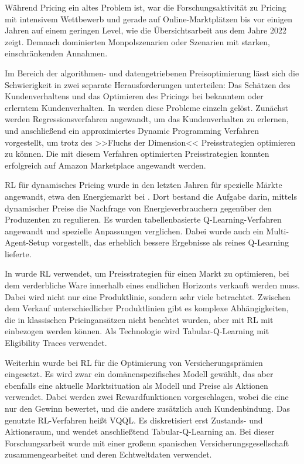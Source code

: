 Während Pricing ein altes Problem ist, war die Forschungsaktivität zu Pricing mit intensivem Wettbewerb und gerade auf Online-Marktplätzen bis vor einigen Jahren auf einem geringen Level, wie die Übersichtsarbeit \cite{Gerpott2022} aus dem Jahre 2022 zeigt.
Demnach dominierten Monpolszenarien oder Szenarien mit starken, einschränkenden Annahmen.

Im Bereich der algorithmen- und datengetriebenen Preisoptimierung lässt sich die Schwierigkeit in zwei separate Herausforderungen unterteilen: Das Schätzen des Kundenverhaltens und das Optimieren des Pricings bei bekanntem oder erlerntem Kundenverhalten.
In \cite{10.1145/3219819.3219833} werden diese Probleme einzeln gelöst.
Zunächst werden Regressionsverfahren angewandt, um das Kundenverhalten zu erlernen, und anschließend ein approximiertes Dynamic Programming Verfahren vorgestellt, um trotz des >>Fluchs der Dimension<< Preisstrategien optimieren zu können.
Die mit diesem Verfahren optimierten Preisstrategien konnten erfolgreich auf Amazon Marketplace angewandt werden.

RL für dynamisches Pricing wurde in den letzten Jahren für spezielle Märkte angewandt, etwa den Energiemarkt bei \cite{Kim2016DynamicPA}.
Dort bestand die Aufgabe darin, mittels dynamischer Preise die Nachfrage von Energieverbrauchern gegenüber den Produzenten zu regulieren.
Es wurden tabellenbasierte Q-Learning-Verfahren angewandt und spezielle Anpassungen verglichen.
Dabei wurde auch ein Multi-Agent-Setup vorgestellt, das erheblich bessere Ergebnisse als reines Q-Learning lieferte.

In \cite{RANA2015426} wurde RL verwendet, um Preisstrategien für einen Markt zu optimieren, bei dem verderbliche Ware innerhalb eines endlichen Horizonts verkauft werden muss.
Dabei wird nicht nur eine Produktlinie, sondern sehr viele betrachtet.
Zwischen dem Verkauf unterschiedlicher Produktlinien gibt es komplexe Abhängigkeiten, die in klassischen Pricingansätzen nicht beachtet wurden, aber mit RL mit einbezogen werden können.
Als Technologie wird Tabular-Q-Learning mit Eligibility Traces verwendet.

Weiterhin wurde bei \cite{KRASHENINNIKOVA20198} RL für die Optimierung von Versicherungsprämien eingesetzt.
Es wird zwar ein domänenspezifisches Modell gewählt, das aber ebenfalls eine aktuelle Marktsituation als Modell und Preise als Aktionen verwendet.
Dabei werden zwei Rewardfunktionen vorgeschlagen, wobei die eine nur den Gewinn bewertet, und die andere zusätzlich auch Kundenbindung.
Das genutzte RL-Verfahren heißt VQQL.
Es diskretisiert erst Zustands- und Aktionsraum, und wendet anschließtend Tabular-Q-Learning an.
Bei dieser Forschungsarbeit wurde mit einer großenn spanischen Versicherungsgesellschaft zusammengearbeitet und deren Echtweltdaten verwendet.

